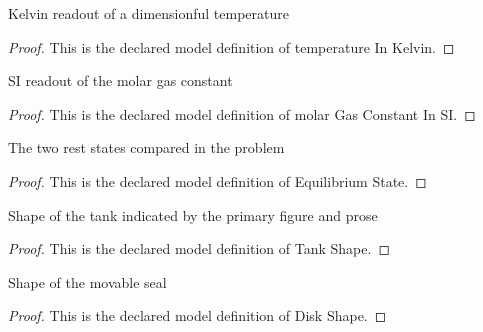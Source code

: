 \begin{definition}
  \label{def:physics:phyx-mini-0333:phyxminiproblems-problemphyxmini0333-temperatureinkelvin}
  Kelvin readout of a dimensionful temperature
\end{definition}
\begin{proof}
  This is the declared model definition of temperature In Kelvin.
\end{proof}
\begin{definition}
  \label{def:physics:phyx-mini-0333:phyxminiproblems-problemphyxmini0333-molargasconstantinsi}
  SI readout of the molar gas constant
\end{definition}
\begin{proof}
  This is the declared model definition of molar Gas Constant In SI.
\end{proof}
\begin{definition}
  \label{def:physics:phyx-mini-0333:phyxminiproblems-problemphyxmini0333-equilibriumstate}
  The two rest states compared in the problem
\end{definition}
\begin{proof}
  This is the declared model definition of Equilibrium State.
\end{proof}
\begin{definition}
  \label{def:physics:phyx-mini-0333:phyxminiproblems-problemphyxmini0333-tankshape}
  Shape of the tank indicated by the primary figure and prose
\end{definition}
\begin{proof}
  This is the declared model definition of Tank Shape.
\end{proof}
\begin{definition}
  \label{def:physics:phyx-mini-0333:phyxminiproblems-problemphyxmini0333-diskshape}
  Shape of the movable seal
\end{definition}
\begin{proof}
  This is the declared model definition of Disk Shape.
\end{proof}
